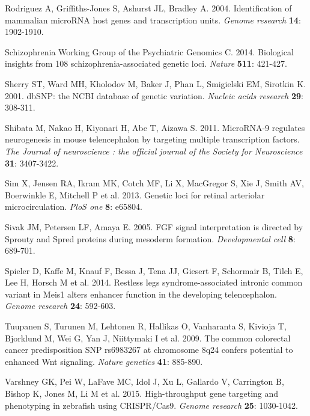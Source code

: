 \documentclass[]{article}
\begin{document}
\protect\hypertarget{_ENREF_25}{}{}Rodriguez A, Griffiths-Jones S,
Ashurst JL, Bradley A. 2004. Identification of mammalian microRNA host
genes and transcription units. \emph{Genome research} \textbf{14}:
1902-1910.

\protect\hypertarget{_ENREF_26}{}{}Schizophrenia Working Group of the
Psychiatric Genomics C. 2014. Biological insights from 108
schizophrenia-associated genetic loci. \emph{Nature} \textbf{511}:
421-427.

\protect\hypertarget{_ENREF_27}{}{}Sherry ST, Ward MH, Kholodov M, Baker
J, Phan L, Smigielski EM, Sirotkin K. 2001. dbSNP: the NCBI database of
genetic variation. \emph{Nucleic acids research} \textbf{29}: 308-311.

\protect\hypertarget{_ENREF_28}{}{}Shibata M, Nakao H, Kiyonari H, Abe
T, Aizawa S. 2011. MicroRNA-9 regulates neurogenesis in mouse
telencephalon by targeting multiple transcription factors. \emph{The
Journal of neuroscience : the official journal of the Society for
Neuroscience} \textbf{31}: 3407-3422.

\protect\hypertarget{_ENREF_29}{}{}Sim X, Jensen RA, Ikram MK, Cotch MF,
Li X, MacGregor S, Xie J, Smith AV, Boerwinkle E, Mitchell P et al.
2013. Genetic loci for retinal arteriolar microcirculation. \emph{PloS
one} \textbf{8}: e65804.

\protect\hypertarget{_ENREF_30}{}{}Sivak JM, Petersen LF, Amaya E. 2005.
FGF signal interpretation is directed by Sprouty and Spred proteins
during mesoderm formation. \emph{Developmental cell} \textbf{8}:
689-701.

\protect\hypertarget{_ENREF_31}{}{}Spieler D, Kaffe M, Knauf F, Bessa J,
Tena JJ, Giesert F, Schormair B, Tilch E, Lee H, Horsch M et al. 2014.
Restless legs syndrome-associated intronic common variant in Meis1
alters enhancer function in the developing telencephalon. \emph{Genome
research} \textbf{24}: 592-603.

\protect\hypertarget{_ENREF_32}{}{}Tuupanen S, Turunen M, Lehtonen R,
Hallikas O, Vanharanta S, Kivioja T, Bjorklund M, Wei G, Yan J,
Niittymaki I et al. 2009. The common colorectal cancer predisposition
SNP rs6983267 at chromosome 8q24 confers potential to enhanced Wnt
signaling. \emph{Nature genetics} \textbf{41}: 885-890.

\protect\hypertarget{_ENREF_33}{}{}Varshney GK, Pei W, LaFave MC, Idol
J, Xu L, Gallardo V, Carrington B, Bishop K, Jones M, Li M et al. 2015.
High-throughput gene targeting and phenotyping in zebrafish using
CRISPR/Cas9. \emph{Genome research} \textbf{25}: 1030-1042.
\end{document}
